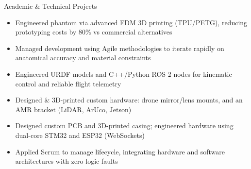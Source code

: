 \documentclass{resume}
\begin{document}
\begin{experienceSection}{Academic \& Technical Projects}
    \projectItem[
        title={Open-Source Gastrointestinal Medical Phantom},
        duration={Ago-Dic 2025 – Feb-Jun 2026},
        keyHighlight={Agile, Advanced FDM}
    ]
    \begin{itemize}
        \vspace{-0.5em}
        \itemsep -6pt {}
        \item Engineered phantom via advanced FDM 3D printing (TPU/PETG), reducing prototyping costs by 80\% vs commercial alternatives
        \item Managed development using Agile methodologies to iterate rapidly on anatomical accuracy and material constraints
    \end{itemize}
    \projectItem[
        title={Port Automation \& Drone Sim},
        duration={Ago-Dic 2025},
        keyHighlight={ROS 2, Gazebo, C++, Python}
    ]
    \begin{itemize}
        \vspace{-0.5em}
        \itemsep -6pt {}
        \item Engineered URDF models and C++/Python ROS 2 nodes for kinematic control and reliable flight telemetry
        \item Designed \& 3D-printed custom hardware: drone mirror/lens mounts, and an AMR bracket (LiDAR, ArUco, Jetson)
    \end{itemize}
    \projectItem[
        title={DigiMix},
        duration={Ago-Dic 2024},
        keyHighlight={Embedded Systems, Scrum}
    ]
    \begin{itemize}
        \vspace{-0.5em}
        \itemsep -6pt {}
        \item Designed custom PCB and 3D-printed casing; engineered hardware using dual-core STM32 and ESP32 (WebSockets)
        \item Applied Scrum to manage lifecycle, integrating hardware and software architectures with zero logic faults
    \end{itemize}
\end{experienceSection}
\end{document}
